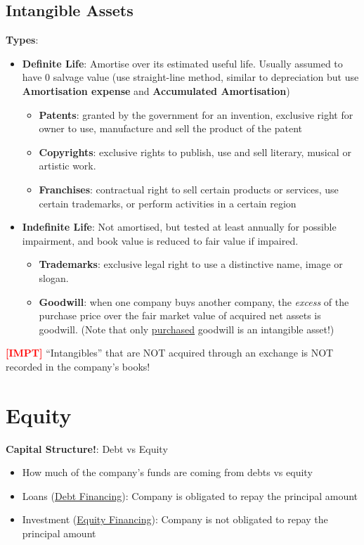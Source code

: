 \documentclass{article}
\newcommand{\impt}[0]{\textcolor{red}{\textbf{[IMPT] }}}
\begin{document}
\begin{multicols}{2}
\subsection{Intangible Assets}
\textbf{Types}:
\begin{itemize}
	\item \textbf{Definite Life}: Amortise over its estimated useful life. Usually assumed to have 0 salvage value (use straight-line method, similar to depreciation but use \textbf{Amortisation expense} and \textbf{Accumulated Amortisation})
	\begin{itemize}
		\item \textbf{Patents}: granted by the government for an invention, exclusive right for owner to use, manufacture and sell the product of the patent
		\item \textbf{Copyrights}: exclusive rights to publish, use and sell literary, musical or artistic work.
		\item \textbf{Franchises}: contractual right to sell certain products or services, use certain trademarks, or perform activities in a certain region
	\end{itemize}
    \item \textbf{Indefinite Life}: Not amortised, but tested at least annually for possible impairment, and book value is reduced to fair value if impaired.
    \begin{itemize}
    	\item \textbf{Trademarks}: exclusive legal right to use a distinctive name, image or slogan.
    	\item \textbf{Goodwill}: when one company buys another company, the \textit{excess} of the purchase price over the fair market value of acquired net assets is goodwill. (Note that only \underline{purchased} goodwill is an intangible asset!)
    \end{itemize}
\end{itemize}
\impt “Intangibles” that are NOT acquired through an exchange is NOT recorded in the company’s books!

\section{Equity}
\textbf{Capital Structure!}: Debt vs Equity
\begin{itemize}
	\item How much of the company's funds are coming from debts vs equity
	\item Loans (\underline{Debt Financing}): Company is obligated to repay the principal amount
	\item Investment (\underline{Equity Financing}): Company is not obligated to repay the principal amount
\end{itemize}

\end{multicols}
\end{document}
